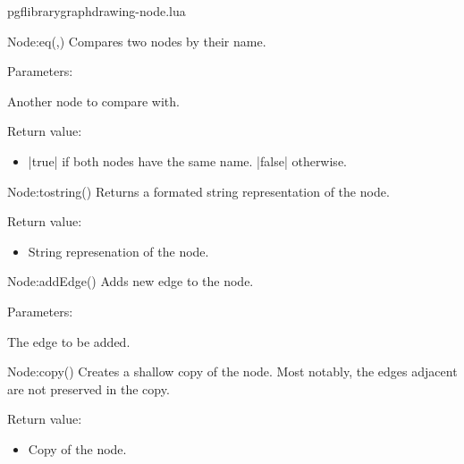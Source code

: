 
\begin{filedescription}{pgflibrarygraphdrawing-node.lua}


\begin{luacommand}{{Node:\textunderscore{}\textunderscore{}eq}(,)}
Compares two nodes by their name. 

Parameters:
\begin{parameterdescription}
	\item[\meta{other}] Another node to compare with. 
\end{parameterdescription}


Return value:
\begin{itemize} \item[] |true| if both nodes have the same name. |false| otherwise.  \end{itemize}


\end{luacommand}\begin{luacommand}{{Node:\textunderscore{}\textunderscore{}tostring}()}
Returns a formated string representation of the node. 


Return value:
\begin{itemize} \item[] String represenation of the node.  \end{itemize}


\end{luacommand}\begin{luacommand}{{Node:addEdge}()}
Adds new edge to the node. 

Parameters:
\begin{parameterdescription}
	\item[\meta{edge}] The edge to be added. 
\end{parameterdescription}



\end{luacommand}\begin{luacommand}{{Node:copy}()}
Creates a shallow copy of the node.  Most notably, the edges adjacent are not preserved in the copy. 


Return value:
\begin{itemize} \item[] Copy of the node.  \end{itemize}



\end{luacommand}
\end{filedescription}
